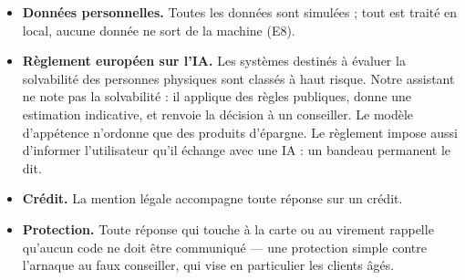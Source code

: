 \begin{itemize}
  \item \textbf{Données personnelles.} Toutes les données sont simulées ; tout est traité en local,
        aucune donnée ne sort de la machine (E8).
  \item \textbf{Règlement européen sur l'IA.} Les systèmes destinés à évaluer la solvabilité des
        personnes physiques sont classés à haut risque. Notre assistant ne note pas la solvabilité :
        il applique des règles publiques, donne une estimation indicative, et renvoie la décision à
        un conseiller. Le modèle d'appétence n'ordonne que des produits d'épargne. Le règlement
        impose aussi d'informer l'utilisateur qu'il échange avec une IA : un bandeau permanent le
        dit.
  \item \textbf{Crédit.} La mention légale accompagne toute réponse sur un crédit.
  \item \textbf{Protection.} Toute réponse qui touche à la carte ou au virement rappelle qu'aucun
        code ne doit être communiqué --- une protection simple contre l'arnaque au faux conseiller,
        qui vise en particulier les clients âgés.
\end{itemize}
